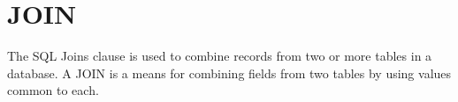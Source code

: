 \section{JOIN}

The SQL Joins clause is used to combine records from two or more tables in a database. A JOIN is a means for combining fields from two tables by using values common to each.

